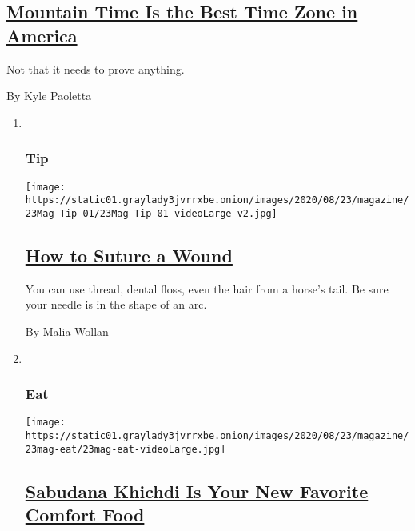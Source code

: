 \begin{enumerate}
  \hypertarget{mountain-time-is-the-best-time-zone-in-america}{%
  \subsection{\texorpdfstring{\href{/2020/08/18/magazine/mountain-time-is-the-best-time-zone-in-america.html}{Mountain
  Time Is the Best Time Zone in
  America}}{Mountain Time Is the Best Time Zone in America}}\label{mountain-time-is-the-best-time-zone-in-america}}

  Not that it needs to prove anything.

  By Kyle Paoletta
\end{enumerate}

\begin{enumerate}
\def\labelenumi{\arabic{enumi}.}
\item ~
  \hypertarget{tip}{%
  \subsubsection{Tip}\label{tip}}

  \texttt{[image: https://static01.graylady3jvrrxbe.onion/images/2020/08/23/magazine/23Mag-Tip-01/23Mag-Tip-01-videoLarge-v2.jpg]}

  \hypertarget{how-to-suture-a-wound}{%
  \subsection{\texorpdfstring{\href{/2020/08/18/magazine/how-to-suture-a-wound.html}{How
  to Suture a
  Wound}}{How to Suture a Wound}}\label{how-to-suture-a-wound}}

  You can use thread, dental floss, even the hair from a horse's tail.
  Be sure your needle is in the shape of an arc.

  By Malia Wollan
\item ~
  \hypertarget{eat}{%
  \subsubsection{Eat}\label{eat}}

  \texttt{[image: https://static01.graylady3jvrrxbe.onion/images/2020/08/23/magazine/23mag-eat/23mag-eat-videoLarge.jpg]}

  \hypertarget{sabudana-khichdi-is-your-new-favorite-comfort-food}{%
  \subsection{\texorpdfstring{\href{/2020/08/19/magazine/sabudana-khichdi-is-your-new-favorite-comfort-food.html}{Sabudana
  Khichdi Is Your New Favorite Comfort
  Food}}{Sabudana Khichdi Is Your New Favorite Comfort Food}}\label{sabudana-khichdi-is-your-new-favorite-comfort-food}}


\end{enumerate}

